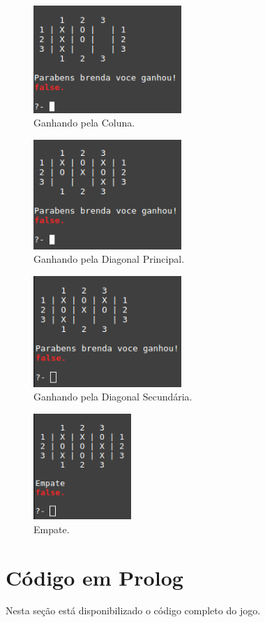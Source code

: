 \documentclass[brazil, a4paper,12pt]{article}
\begin{document}
\begin{figure}[!h]
\centering
\includegraphics[width=0.5\textwidth]{img/COLUNA.png}
\caption{\label{fig:fig2}Ganhando pela Coluna.}
\end{figure}

\begin{figure}[!h]
\centering
\includegraphics[width=0.5\textwidth]{img/DIAGONALPRINCIPAL.png}
\caption{\label{fig:fig3}Ganhando pela Diagonal Principal.}
\end{figure}

\newpage
\begin{figure}[!h]
\centering
\includegraphics[width=0.5\textwidth]{img/DIAGONALSECUNDARIA.png}
\caption{\label{fig:fig4}Ganhando pela Diagonal Secundária.}
\end{figure}

\begin{figure}[!h]
\centering
\includegraphics[width=0.33\textwidth]{img/EMPATE.png}
\caption{\label{fig:fig5}Empate.}
\end{figure}

\newpage
\section{Código em Prolog}
Nesta seção está disponibilizado o código completo do jogo.


\end{document}
